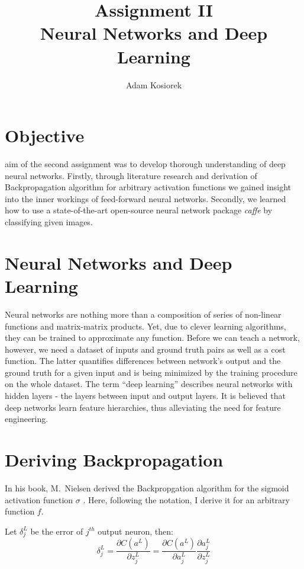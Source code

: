 \documentclass[journal, a4paper]{IEEEtran}
\begin{document}
	\title{Assignment II\\Neural Networks and Deep Learning}
	\author{Adam Kosiorek}	
	\maketitle
	
	
\section{Objective}
     aim of the second assignment was to develop thorough understanding of deep neural networks. Firstly, through literature research and derivation of Backpropagation algorithm for arbitrary activation functions we gained insight into the inner workings of feed-forward neural networks. Secondly, we learned how to use a state-of-the-art open-source neural network package \textit{caffe} \cite{caffe} by classifying given images.

\section{Neural Networks and Deep Learning}
    Neural networks are nothing more than a composition of series of non-linear functions and matrix-matrix products. Yet, due to clever learning algorithms, they can be trained to approximate any function. Before we can teach a network, however, we need a dataset of inputs and ground truth pairs as well as a cost function. The latter quantifies differences between network's output and the ground truth for a given input and is being minimized by the training procedure on the whole dataset. The term ``deep learning'' describes neural networks with hidden layers - the layers between input and output layers. It is believed that deep networks learn feature hierarchies, thus alleviating the need for feature engineering.

\section{Deriving Backpropagation}
    In his book, M.~Nielsen derived the Backpropgation algorithm for the sigmoid activation function $\sigma$ \cite{MLDL}. Here, following the notation, I derive it for an arbitrary function $f$.
    
    Let $\delta_j^L$ be the error of $j^{th}$ output neuron, then:
    \begin{equation}
      \delta_j^L = \frac{\partial C(a^L)}{\partial z_j^L} = \frac{\partial C(a^L)}{\partial a_j^L} \frac{\partial a_j^L}{\partial z_j^L}
      \label{eq:error_L}
    \end{equation}
    
\end{document}
